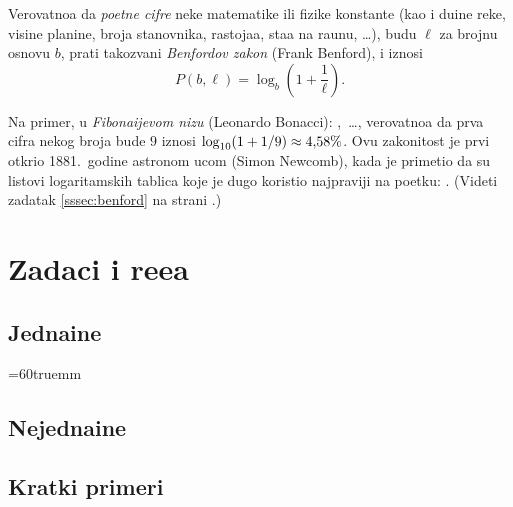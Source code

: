 \documentclass[12pt, twoside, a4paper]{article}
\def\logten{\log_{10}}
\def\.{\smash{,}\vphantom{.}}
\begin{document}
Verovatno{\cc}a da {\sl po{\cv}etne cifre\/} neke matemati{\cv}ke ili fizi{\cv}ke konstante
(kao i du{\zv}ine reke, visine planine, broja stanovnika, rastoja{\nj}a,
sta{\nj}a na ra{\cv}unu, \dots), 
budu $\ell$ za brojnu osnovu $b$, prati takozvani {\sl Benfordov zakon\/} (Frank Benford), i iznosi
\begin{equation}\label{eq:benford}
  P(b,\ell)=\log_b \left(1+\frac1\ell\right).
\end{equation}

Na primer, u {\sl Fibona{\cv}ijevom  nizu\/} (Leonardo Bonacci): ,~\dots,
verovatno{\cc}a da prva cifra nekog broja bude $9$ iznosi $\logten(1+1/9)\approx4\.58\%$.
Ovu zakonitost je prvi otkrio 1881.\ godine astronom {\Nj}ucom (Simon Newcomb), kada je primetio da su
listovi logaritamskih tablica koje je dugo koristio najpr{\lj}aviji
na po{\cv}etku: .
(Videti zadatak \ref{sssec:benford} na strani \pageref{sssec:benford}.)

% 

\section{Zadaci i re{\sv}e{\nj}a}\label{sec:zadaci}

\subsection{Jedna{\cv}ine}

\newdimen\sirina \sirina=60truemm

\def\jed{Jedna{\cv}ina~}










\newpage

\subsection{Nejedna{\cv}ine}






% 

% 


\newpage


\subsection{Kratki primeri}
\end{document}
